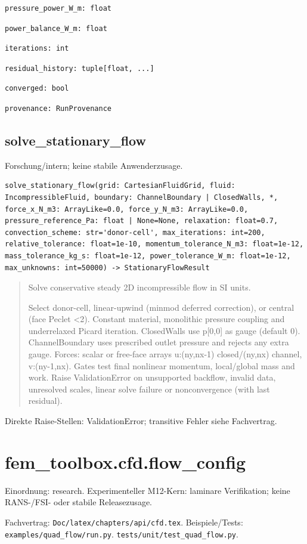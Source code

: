 \begin{lstlisting}
pressure_power_W_m: float
\end{lstlisting}
\begin{lstlisting}
power_balance_W_m: float
\end{lstlisting}
\begin{lstlisting}
iterations: int
\end{lstlisting}
\begin{lstlisting}
residual_history: tuple[float, ...]
\end{lstlisting}
\begin{lstlisting}
converged: bool
\end{lstlisting}
\begin{lstlisting}
provenance: RunProvenance
\end{lstlisting}
\subsection{solve\_stationary\_flow}
Forschung/intern; keine stabile Anwenderzusage.
\begin{lstlisting}
solve_stationary_flow(grid: CartesianFluidGrid, fluid: IncompressibleFluid, boundary: ChannelBoundary | ClosedWalls, *, force_x_N_m3: ArrayLike=0.0, force_y_N_m3: ArrayLike=0.0, pressure_reference_Pa: float | None=None, relaxation: float=0.7, convection_scheme: str='donor-cell', max_iterations: int=200, relative_tolerance: float=1e-10, momentum_tolerance_N_m3: float=1e-12, mass_tolerance_kg_s: float=1e-12, power_tolerance_W_m: float=1e-12, max_unknowns: int=50000) -> StationaryFlowResult
\end{lstlisting}
\begin{quote}
Solve conservative steady 2D incompressible flow in SI units.\par Select donor-cell, linear-upwind (minmod deferred correction), or central (face Peclet <2). Constant material, monolithic pressure coupling and underrelaxed Picard iteration. ClosedWalls use p[0,0] as gauge (default 0). ChannelBoundary uses prescribed outlet pressure and rejects any extra gauge. Forces: scalar or free-face arrays u:(ny,nx-1) closed/(ny,nx) channel, v:(ny-1,nx). Gates test final nonlinear momentum, local/global mass and work. Raise ValidationError on unsupported backflow, invalid data, unresolved scales, linear solve failure or nonconvergence (with last residual).
\end{quote}
Direkte Raise-Stellen: ValidationError; transitive Fehler siehe Fachvertrag.
\section{fem\_toolbox.cfd.flow\_config}
Einordnung: research. Experimenteller M12-Kern: laminare Verifikation; keine RANS-/FSI- oder stabile Releasezusage.
\par Fachvertrag: \nolinkurl{Doc/latex/chapters/api/cfd.tex}. Beispiele/Tests:
\nolinkurl{examples/quad_flow/run.py}.
\nolinkurl{tests/unit/test_quad_flow.py}.
